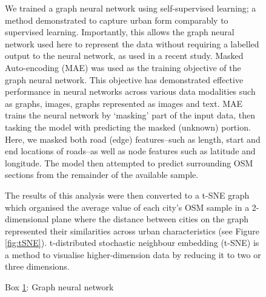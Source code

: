 \documentclass[preprint,10pt]{elsarticle} %
\begin{document}
{\begin{figure}
{{We trained a graph neural network using self-supervised learning; a method demonstrated to capture urban form comparably to supervised learning\cite{seneviratne2021self}. Importantly, this allows the graph neural network used here to represent the data without requiring a labelled output to the neural network, as used in a recent study\cite{Thompson2020}. Masked Auto-encoding (MAE) was used as the training objective of the graph neural network. This objective has demonstrated effective performance in neural networks across various data modalities such as graphs\cite{hou2022graphmae}, images\cite{he2022masked}, graphs represented as images\cite{seneviratne2022self} and text\cite{devlin2018bert}. MAE trains the neural network by `masking' part of the input data, then tasking the model with predicting the masked (unknown) portion. Here, we masked both road (edge) features--such as length, start and end locations of roads--as well as node features such as latitude and longitude. The model then attempted to predict surrounding OSM sections from the remainder of the available sample. 

The results of this analysis were then converted to a t-SNE\cite{scikit-learn} graph which organised the average value of each city's OSM sample in a 2-dimensional plane where the distance between cities on the graph represented their similarities across urban characteristics (see Figure \ref{fig:tSNE}). t-distributed stochastic neighbour embedding (t-SNE) is a method to visualise higher-dimension data by reducing it to two or three dimensions.
}}
\captionsetup{labelformat=empty}
\caption{Box \ref{box:gnn}: Graph neural network}\label{box:gnn}
\end{figure}



\begin{figure}
\end{figure}}
\end{document}

